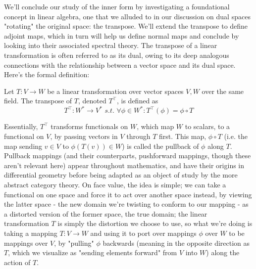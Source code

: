 \documentclass{article}
\newcommand{\n}{\leavevmode \newline}
\newcommand{\nn}{\leavevmode \newline \newline}
\newcommand{\sti}{\textit{ s.t. }}
\begin{document}
\n
We'll conclude our study of the inner form by investigating a foundational concept in linear algebra, one that we alluded to in our discussion on dual spaces "rotating" the original space: the transpose. We'll extend the transpose to define adjoint maps, which in turn will help us define normal maps and conclude by looking into their associated spectral theory.
\nn
The transpose of a linear transformation is often referred to as its dual, owing to its deep analogous connections with the relationship between a vector space and its dual space. Here's the formal definition:
\n
\begin{adjustwidth}{1cm}{1cm}

    Let $ T: V \rightarrow W $ be a linear transformation over vector spaces $ V, W $ over the same field. The transpose of $ T $, denoted $ T^\intercal $, is defined as
    $$ T^\intercal: W^* \rightarrow V^* \sti \forall \phi \in W^*: T^\intercal(\phi) = \phi \circ T $$

\end{adjustwidth}
\n
Essentially, $ T^\intercal $ transforms functionals on $ W $, which map $ W $ to scalars, to a functional on $ V $, by passing vectors in $ V $ through $ T $ first. This map, $ \phi \circ T $ (i.e. the map sending $ v \in V $ to $ \phi(T(v)) \in W $) is called the pullback of $ \phi $ along $ T $. Pullback mappings (and their counterparts, pushforward mappings, though these aren't relevant here) appear throughout mathematics, and have their origins in differential geometry before being adapted as an object of study by the more abstract category theory. On face value, the idea is simple; we can take a functional on one space and force it to act over another space instead, by viewing the latter space - the new domain we're twisting to conform to our mapping - as a distorted version of the former space, the true domain; the linear transformation $ T $ is simply the distortion we choose to use, so what we're doing is taking a mapping $ T: V \rightarrow W $ and using it to port over mappings $ \phi $ over $ W $ to be mappings over $ V $, by "pulling" $ \phi $ backwards (meaning in the opposite direction as $ T $, which we visualize as "sending elements forward" from $ V $ into $ W $) along the action of $ T $.
\nn
\end{document}
